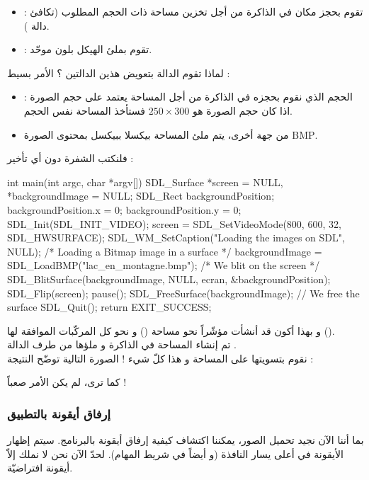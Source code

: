 \begin{itemize}
	\item {} :
	تقوم بحجز مكان في الذاكرة من أجل تخزين مساحة ذات الحجم المطلوب (تكافئ دالة 
	).
	\item {} :
	تقوم بملئ الهيكل بلون موحّد.
\end{itemize}
لماذا تقوم الدالة بتعويض هذين الدالتين ؟ الأمر بسيط :
\begin{itemize}
	\item الحجم الذي نقوم بحجزه في الذاكرة  من أجل المساحة يعتمد على حجم الصورة : اذا كان حجم الصورة هو 
	$250 \times 300$
	فستأخذ المساحة نفس الحجم.
	\item من جهة أخرى، يتم ملئ المساحة بيكسلا ببيكسل بمحتوى الصورة 
	\textenglish{BMP}.
\end{itemize}

فلنكتب الشفرة دون أي تأخير :

\begin{Csource}
int main(int argc, char *argv[])
{
	SDL_Surface *screen = NULL, *backgroundImage = NULL;
	SDL_Rect backgroundPosition;
	backgroundPosition.x = 0;
	backgroundPosition.y = 0;
	SDL_Init(SDL_INIT_VIDEO);
	screen = SDL_SetVideoMode(800, 600, 32, SDL_HWSURFACE);
	SDL_WM_SetCaption("Loading the images on SDL", NULL);
	/* Loading a Bitmap image in a surface */	
	backgroundImage = SDL_LoadBMP("lac_en_montagne.bmp");
	/* We blit on the screen */
	SDL_BlitSurface(backgroundImage, NULL, ecran, &backgroundPosition);
	SDL_Flip(screen);
	pause();
	SDL_FreeSurface(backgroundImage); // We free the surface
	SDL_Quit();
	return EXIT_SUCCESS;
}
\end{Csource}

و بهذا أكون قد أنشأت مؤشّراً نحو مساحة
()
و نحو كل المركّبات الموافقة لها
().\\
تم إنشاء المساحة في الذاكرة و ملؤها من طرف الدالة 
.\\
نقوم بتسويتها على المساحة 
و هذا كلّ شيء ! الصورة التالية توضّح النتيجة :


كما ترى، لم يكن الأمر صعباً !

\subsubsection{إرفاق أيقونة بالتطبيق}

بما أننا الآن نجيد تحميل الصور، يمكننا اكتشاف كيفية إرفاق أيقونة بالبرنامج. سيتم إظهار الأيقونة في أعلى يسار النافذة (و أيضاً في شريط المهام). لحدّ الآن نحن لا نملك إلاّ أيقونة افتراضيّة.

